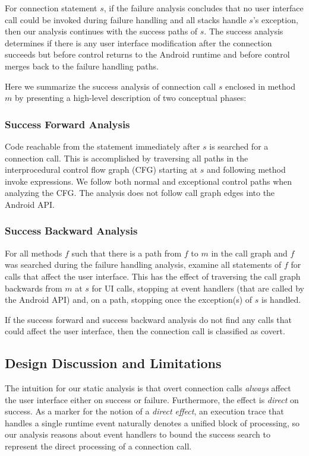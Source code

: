 For connection statement $s$, if the failure analysis concludes that
no user interface call could be invoked during failure handling and
all stacks handle $s$'s exception, then our analysis continues with
the success paths of $s$. The success analysis determines if there is
any user interface modification after the connection succeeds but
before control returns to the Android runtime and before control
merges back to the failure handling paths.

Here we summarize the success analysis of connection call $s$ enclosed
in method $m$ by presenting a high-level description of two conceptual
phases:

\subsubsection{Success Forward Analysis} Code reachable from the
  statement immediately after $s$ is searched for a connection call.
  This is accomplished by traversing all paths in the interprocedural
  control flow graph (CFG) starting at $s$ and following method invoke
  expressions.  We follow both normal and exceptional control paths
  when analyzing the CFG.  The analysis does not follow call graph
  edges into the Android API.

\subsubsection{Success Backward Analysis} For all methods $f$ such
  that there is a path from $f$ to $m$ in the call graph and $f$ was
  searched during the failure handling analysis, examine all
  statements of $f$ for calls that affect the user interface.  This
  has the effect of traversing the call graph backwards from $m$ at
  $s$ for UI calls, stopping at event handlers (that are called by the
  Android API) and, on a path, stopping once the exception(s) of $s$ is
  handled.

If the success forward and success backward analysis do not find any
calls that could affect the user interface, then the connection call
is classified as covert.

\subsection{Design Discussion and Limitations}

The intuition for our static analysis is that overt connection
calls {\it always} affect the user interface either on success or
failure. Furthermore, the effect is {\it direct} on success.  As a
marker for the notion of a {\it direct effect}, an execution trace
that handles a single runtime event naturally denotes a unified block
of processing, so our analysis reasons about event handlers to bound
the success search to represent the direct processing of a connection
call.

